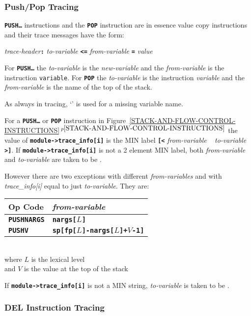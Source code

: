 \documentclass[12pt]{article}
\newcommand{\TT}[1]{{\tt \bfseries #1}}
\newcommand{\itemref}[1]{\ref{#1}$\,^{p\pageref{#1}}$}
\newcommand{\EOL}{\penalty \exhyphenpenalty}
\begin{document}
\subsubsection{Push/Pop Tracing}
\label{PUSH/POP-TRACING}

\TT{PUSH\ldots} instructions and the \TT{POP} instruction are in essence
value copy instructions and their trace messages
have the form:

\begin{center}
{\em trace-header}\TT{:} {\em to-variable}
                    \TT{<=} {\em from-variable} \TT{=} {\em value}
\end{center}

For \TT{PUSH\ldots} the {\em to-variable} is the {\em new-variable}
and the {\em from-variable} is the instruction {\tt variable}.
For \TT{POP} the {\em to-variable} is the instruction {\em variable}
and the {\em from-variable} is the name of the top of the stack.

As always in tracing, `\TT{*}' is used for a missing variable name.

For a \TT{PUSH\ldots} or \TT{POP} instruction
in Figure~\itemref{STACK-AND-FLOW-CONTROL-INSTRUCTIONS}
the value of
\TT{module->\EOL trace\_\EOL info[i]} is the MIN label
\TT{[<} {\em from-variable} ~ {\em to-variable} \TT{>]}.
If \TT{module->\EOL trace\_\EOL info[i]} is not a 2 element MIN label,
both {\em from-variable} and {\em to-variable} are taken to be \TT{*}.

However there are two exceptions with different {\em from-variables}
and with {\em trace\_\EOL info[i]} equal to just {\em to-variable}.
They are:
\begin{center}
\begin{tabular}{l@{~~~~~}l}
\bf Op Code & \bf \em from-variable
\\\hline
\TT{PUSHNARGS} & \TT{nargs[$L$]} \\
\TT{PUSHV}     & \TT{sp[fp[$L$]-nargs[$L$]+$V$-1]}
\end{tabular}
\\[1ex]
where $L$ is the lexical level \\
and $V$ is the value at the top of the stack
\end{center}
If \TT{module->\EOL trace\_\EOL info[i]} is not a MIN string,
{\em to-variable} is taken to be \TT{*}.

\subsubsection{DEL Instruction Tracing}
\label{DEL-INSTRUCTION-TRACING}
\end{document}
